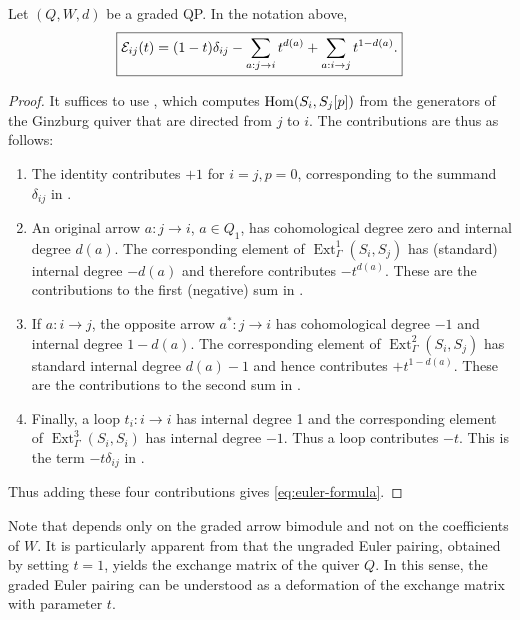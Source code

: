 \begin{proposition}\label{prop:euler-formula}
Let $(Q,W,d)$ be a graded QP. In the notation above,
\begin{equation}\label{eq:euler-formula}
 \boxed{
 \mathcal E_{ij}(t)
 =(1-t)\delta_{ij}
 -\sum_{a:j\to i}t^{d(a)}
 +\sum_{a:i\to j}t^{1-d(a)}.}
\end{equation}
\end{proposition}

\begin{proof}
It suffices to use \cite[Lemma~2.15]{KellerYang}, which computes
\(\operatorname{Hom}(S_i,S_j[p])\) from the generators of the Ginzburg quiver that are directed from
\(j\) to \(i\). The contributions are thus as follows:

\begin{enumerate}
    \item The identity contributes \(+1\) for \(i=j,p=0\), corresponding to the summand $\delta_{ij}$ in .\\
    \item An original arrow \(a:j\to i\), $a\in Q_1$, has cohomological degree zero and internal degree \(d(a)\). The corresponding element of
$\operatorname{Ext}^1_\Gamma(S_i,S_j)$ has (standard) internal degree
$-d(a)$ and therefore contributes $-t^{d(a)}$. These are the contributions to the first (negative) sum in .\\
    \item If \(a:i\to j\), the opposite arrow \(a^*:j\to i\) has cohomological degree \(-1\) and internal degree \(1-d(a)\). The corresponding element of $\operatorname{Ext}^2_\Gamma(S_i,S_j)$ has standard internal degree $d(a)-1$ and hence contributes \(+t^{1-d(a)}\). These are the contributions to the second sum in .\\
    \item Finally, a loop \(t_i:i\to i\) has internal degree 1 and the
corresponding element of
$\operatorname{Ext}^3_\Gamma(S_i,S_i)$ has internal degree
$-1$. Thus a loop contributes $-t$. This is the term $-t\delta_{ij}$ in .
\end{enumerate}
Thus adding these four contributions gives \eqref{eq:euler-formula}.
\end{proof}

\noindent Note that  depends only on the graded arrow bimodule and not
on the coefficients of \(W\). It is particularly apparent from  that the ungraded Euler pairing, obtained by setting $t=1$, yields the exchange matrix of the quiver $Q$. In this sense, the graded Euler pairing can be understood as a deformation of the exchange matrix with parameter $t$.\\

